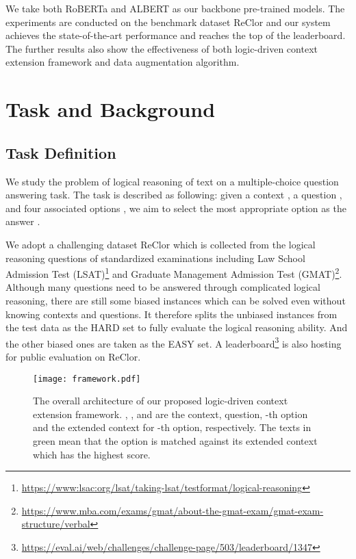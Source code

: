 \documentclass[11pt,a4paper]{article}
\begin{document}
We take both RoBERTa \cite{liu2019roberta} and ALBERT \cite{lan2019albert} as our backbone pre-trained models. The experiments are conducted on the benchmark dataset ReClor \cite{yu2020reclor} and our system achieves the state-of-the-art performance and reaches the top of the leaderboard. The further results also show the effectiveness of both logic-driven context extension framework and data augmentation algorithm.


\section{Task and Background}
\subsection{Task Definition}
\label{task_definition}
We study the problem of logical reasoning of text on a multiple-choice question answering task. The task is described as following: given a context , a question , and four associated options , we aim to select the most appropriate option as the answer . 

We adopt a challenging dataset ReClor \cite{yu2020reclor} which is collected from the logical reasoning questions of standardized examinations including Law School Admission Test (LSAT)\footnote{\url{https://www:lsac:org/lsat/taking-lsat/testformat/logical-reasoning}} and Graduate Management Admission Test (GMAT)\footnote{\url{https://www.mba.com/exams/gmat/about-the-gmat-exam/gmat-exam-structure/verbal}}. 
Although many questions need to be answered through complicated logical reasoning, there are still some biased instances which can be solved even without knowing contexts and questions.
It therefore splits the unbiased instances from the test data as the HARD set to fully evaluate the logical reasoning ability. And the other biased ones are taken as the EASY set. A leaderboard\footnote{\url{https://eval.ai/web/challenges/challenge-page/503/leaderboard/1347}} is also hosting for public evaluation on ReClor.

\begin{figure*}[!th]
\centering
\texttt{[image: framework.pdf]}
\caption{\label{figure_framework} The overall architecture of our proposed logic-driven context extension framework. , ,  and  are the context, question, -th option and the extended context for -th option, respectively.
The texts in \textcolor[RGB]{74,163,87}{green} mean that the option  is matched against its extended context which has the highest score.}
\end{figure*}
\end{document}

